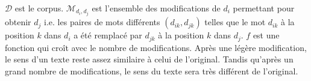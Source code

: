 $\mathcal{D}$ est le corpus. $\mathcal{M}_{d_i, d_j}$ est l'ensemble des modifications de $d_i$ permettant pour obtenir $d_j$ i.e. les paires de mots différents $(d_{ik}, d_{jk})$ telles que le mot $d_{ik}$ à la position $k$ dans $d_i$ a été remplacé par $d_{jk}$ à la position $k$ dans $d_j$. $f$ est une fonction qui croît avec le nombre de modifications. Après une légère modification, le sens d'un texte reste assez similaire à celui de l'original. Tandis qu'après un grand nombre de modifications, le sens du texte sera très différent de l'original. 

%

